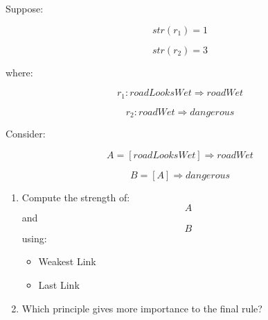 \documentclass[11pt]{article}
\begin{document}
Suppose:

\[
str(r_1)=1
\]

\[
str(r_2)=3
\]

where:

\[
r_1: roadLooksWet \Rightarrow roadWet
\]

\[
r_2: roadWet \Rightarrow dangerous
\]

Consider:

\[
A=[roadLooksWet] \Rightarrow roadWet
\]

\[
B=[A] \Rightarrow dangerous
\]

\begin{enumerate}
    \item Compute the strength of:
    \[
    A
    \]
    and
    \[
    B
    \]
    using:
    \begin{itemize}
        \item Weakest Link
        \item Last Link
    \end{itemize}

    \item Which principle gives more importance to the final rule?
\end{enumerate}
\end{document}
